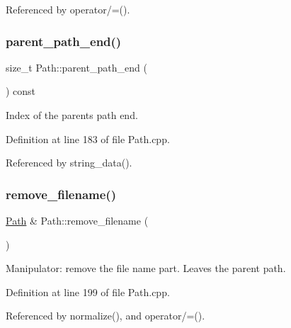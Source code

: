 Referenced by operator/=().

\hypertarget{class_d_d4hep_1_1_path_af49b1479dce2adef730ed0cf22395194}{}\label{class_d_d4hep_1_1_path_af49b1479dce2adef730ed0cf22395194} 
\subsubsection{\texorpdfstring{parent\+\_\+path\+\_\+end()}{parent\_path\_end()}}
{\footnotesize\ttfamily size\+\_\+t Path\+::parent\+\_\+path\+\_\+end (\begin{DoxyParamCaption}{ }\end{DoxyParamCaption}) const}



Index of the parent\textquotesingle{}s path end. 



Definition at line 183 of file Path.\+cpp.



Referenced by string\+\_\+data().

\hypertarget{class_d_d4hep_1_1_path_aa969a2f648dce5181c569478cd69c0be}{}\label{class_d_d4hep_1_1_path_aa969a2f648dce5181c569478cd69c0be} 
\subsubsection{\texorpdfstring{remove\+\_\+filename()}{remove\_filename()}}
{\footnotesize\ttfamily \hyperlink{class_d_d4hep_1_1_path}{Path} \& Path\+::remove\+\_\+filename (\begin{DoxyParamCaption}{ }\end{DoxyParamCaption})}



Manipulator\+: remove the file name part. Leaves the parent path. 



Definition at line 199 of file Path.\+cpp.



Referenced by normalize(), and operator/=().

\hypertarget{class_d_d4hep_1_1_path_ac341b2b07e9591dd46d75f70d44ba375}{}\label{class_d_d4hep_1_1_path_ac341b2b07e9591dd46d75f70d44ba375} 
